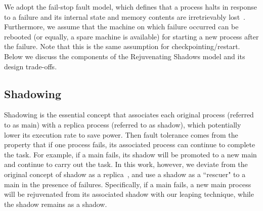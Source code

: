 

We adopt the fail-stop fault model, which defines that a process halts in response to a failure and its internal state and memory contents are irretrievably 
lost~\cite{Schlichting1983}. Furthermore, we assume that the machine on which failure occurred can be rebooted (or equally, a spare machine is available) for starting a new process after the failure. Note that this is the same assumption for checkpointing/restart. Below we discuss the components of the Rejuvenating Shadows model and its design trade-offs.
 

\subsection{Shadowing}
\label{sec:shadow}
Shadowing is the essential concept that associates each original process (referred to as main) with a replica process (referred to as shadow), which potentially lower its execution rate to save power. Then fault tolerance comes from the property that if one process fails, its associated process can continue to complete the task. For example, if a main fails, its shadow will be promoted to a new main and continue to carry out the task. 
In this work, however, we deviate from the original concept of shadow as a replica~\cite{cui_2016_scalcom}, and use a shadow as a ``rescuer" to a main in the presence of failures. Specifically, if a main fails, a new main process will be rejuvenated from its associated shadow with our leaping technique, while the shadow remains as a shadow. 


